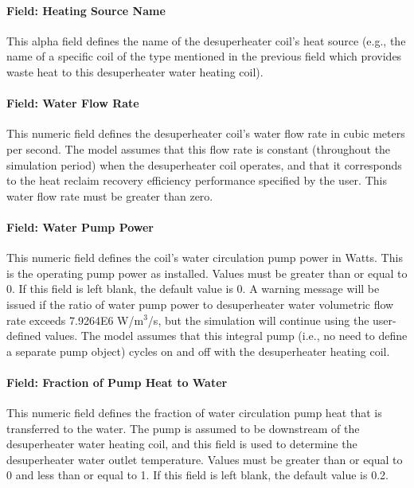 \paragraph{Field: Heating Source Name}\label{field-heating-source-name-1}

This alpha field defines the name of the desuperheater coil's heat source (e.g., the name of a specific coil of the type mentioned in the previous field which provides waste heat to this desuperheater water heating coil).

\paragraph{Field: Water Flow Rate}\label{field-water-flow-rate}

This numeric field defines the desuperheater coil's water flow rate in cubic meters per second. The model assumes that this flow rate is constant (throughout the simulation period) when the desuperheater coil operates, and that it corresponds to the heat reclaim recovery efficiency performance specified by the user. This water flow rate must be greater than zero.

\paragraph{Field: Water Pump Power}\label{field-water-pump-power}

This numeric field defines the coil's water circulation pump power in Watts. This is the operating pump power as installed. Values must be greater than or equal to 0. If this field is left blank, the default value is 0. A warning message will be issued if the ratio of water pump power to desuperheater water volumetric flow rate exceeds 7.9264E6 W/m\(^{3}\)/s, but the simulation will continue using the user-defined values. The model assumes that this integral pump (i.e., no need to define a separate pump object) cycles on and off with the desuperheater heating coil.

\paragraph{Field: Fraction of Pump Heat to Water}\label{field-fraction-of-pump-heat-to-water}

This numeric field defines the fraction of water circulation pump heat that is transferred to the water. The pump is assumed to be downstream of the desuperheater water heating coil, and this field is used to determine the desuperheater water outlet temperature. Values must be greater than or equal to 0 and less than or equal to 1. If this field is left blank, the default value is 0.2.

